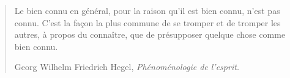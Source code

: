 
    
\begin{quote}
    Le bien connu en général, pour la raison qu'il est bien connu, n'est pas connu. C'est la façon la plus commune de se tromper et de tromper les autres, à propos du connaître, que de présupposer quelque chose comme bien connu.

    Georg Wilhelm Friedrich Hegel, \emph{Phénoménologie de l’esprit.}
\end{quote}


